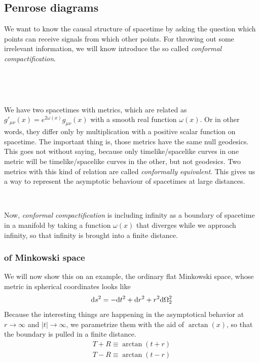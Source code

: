 \subsection{Penrose diagrams}
	We want to know the causal structure of spacetime by asking the question which points can receive signals from which other points. 
For throwing out some irrelevant information, we will know introduce the so called \textit{conformal compactification}.
\parbox{\linewidth}{~}
\hfill
\parbox{0.02\linewidth}{~}
\begin{minipage}[][][c]{0.96\textwidth}
We have two spacetimes with metrics, which are related as $g'_{\mu\nu}(x)=e^{2\omega(x)}g_{\mu\nu}(x)$ with a smooth real function $\omega(x)$. Or in other words, they differ only by multiplication with a positive scalar function on spacetime. The important thing is, those metrics have the same null geodesics.
This goes not without saying, because only timelike/spacelike curves in one metric will be timelike/spacelike curves in the other, but not geodesics.
Two metrics with this kind of relation are called \textit{conformally equivalent}. 
This gives us a way to represent the asymptotic behaviour of spacetimes at large distances.
\end{minipage}
\hfill

\parbox{\linewidth}{~}%

Now, \textit{conformal compactification} is including infinity as a boundary of spacetime in a manifold by taking a function $\omega(x)$ that diverges while we approach infinity, so that infinity is brought into a finite distance.

	\subsubsection{of Minkowski space \checkmark}
		
	We will now show this on an example, the ordinary flat Minkowski space, whose metric in spherical coordinates looks like
		\begin{equation}
			\mathrm{d} s^2=- \mathrm{d} t^2+ \mathrm{d} r^2+r^2 \mathrm{d} \Omega^2_2
		\end{equation}
	Because the interesting things are happening in the asymptotical behavior at $r \rightarrow \infty$ and $|t| \rightarrow \infty$, we parametrize them with the aid of $\arctan(x)$, so that the boundary is pulled in a finite distance.
		\begin{equation}
		\begin{split}
			T+R\equiv\arctan(t+r) \\
			T-R\equiv\arctan(t-r)
		\end{split}
		\end{equation}
	
